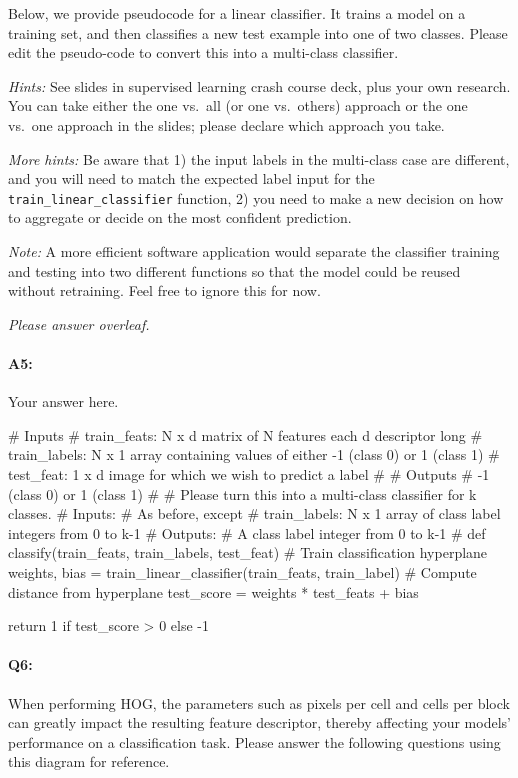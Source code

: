 Below, we provide pseudocode for a linear classifier. It trains a model on a training set, and then classifies a new test example into one of two classes. Please edit the pseudo-code to convert this into a multi-class classifier. 

\emph{Hints:} See slides in supervised learning crash course deck, plus your own research. You can take either the one vs.~all (or one vs.~others) approach or the one vs.~one approach in the slides; please declare which approach you take.

\emph{More hints:} Be aware that 1) the input labels in the multi-class case are different, and you will need to match the expected label input for the \texttt{train\_linear\_classifier} function, 2) you need to make a new decision on how to aggregate or decide on the most confident prediction.

\emph{Note:} A more efficient software application would separate the classifier training and testing into two different functions so that the model could be reused without retraining. Feel free to ignore this for now.

\emph{Please answer overleaf.}

\pagebreak
\paragraph{A5:} Your answer here.

\begin{python}
# Inputs
#   train_feats: N x d matrix of N features each d descriptor long
#   train_labels: N x 1 array containing values of either -1 (class 0) or 1 (class 1)
#   test_feat: 1 x d image for which we wish to predict a label
#
# Outputs
#   -1 (class 0) or 1 (class 1)
#
# Please turn this into a multi-class classifier for k classes.
# Inputs:
#    As before, except
#    train_labels: N x 1 array of class label integers from 0 to k-1
# Outputs:
#    A class label integer from 0 to k-1
#
def classify(train_feats, train_labels, test_feat)
    # Train classification hyperplane
    weights, bias = train_linear_classifier(train_feats, train_label)
    # Compute distance from hyperplane
    test_score = weights * test_feats + bias

    return 1 if test_score > 0 else -1
\end{python}


\pagebreak

\paragraph{Q6:} When performing HOG, the parameters such as pixels per cell and cells per block can greatly impact the resulting feature descriptor, thereby affecting your models' performance on a classification task. Please answer the following questions using this diagram for reference.

